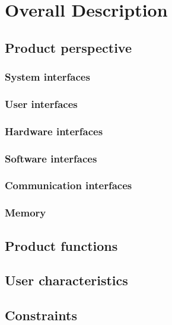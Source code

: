\pagebreak
\section{Overall Description}
\subsection{Product perspective}
\subsubsection{System interfaces}
\subsubsection{User interfaces}
\subsubsection{Hardware interfaces}
% 
\subsubsection{Software interfaces}
\subsubsection{Communication interfaces}
\subsubsection{Memory}

\subsection{Product functions}
\subsection{User characteristics}
\subsection{Constraints}

